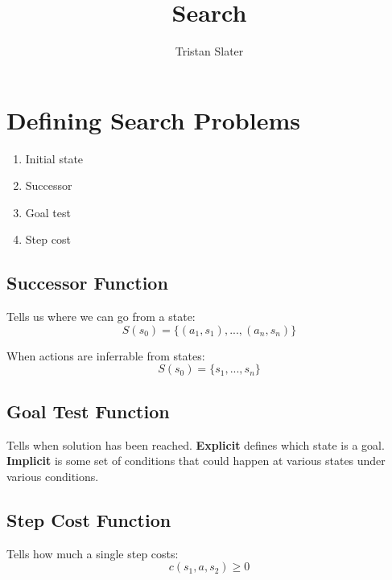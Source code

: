 \documentclass{article}
\title{Search}
\author{Tristan Slater}
\begin{document}
    \maketitle

    \tableofcontents

    \section{Defining Search Problems}

    \begin{enumerate}
        \item Initial state
        \item Successor
        \item Goal test
        \item Step cost
    \end{enumerate}

    \subsection{Successor Function}

    Tells us where we can go from a state: \begin{equation}
        S(s_0) = \{(a_1, s_1), ..., (a_n, s_n)\}
    \end{equation}

    When actions are inferrable from states: \begin{equation}
        S(s_0) = \{s_1, ..., s_n\}
    \end{equation}

    \subsection{Goal Test Function}

    Tells when solution has been reached. \textbf{Explicit} defines which state is a goal. \textbf{Implicit} is some set of conditions that could happen at various states under various conditions.

    \subsection{Step Cost Function}

    Tells how much a single step costs: \begin{equation}
        c(s_1, a, s_2) \geq 0
    \end{equation}
\end{document}
